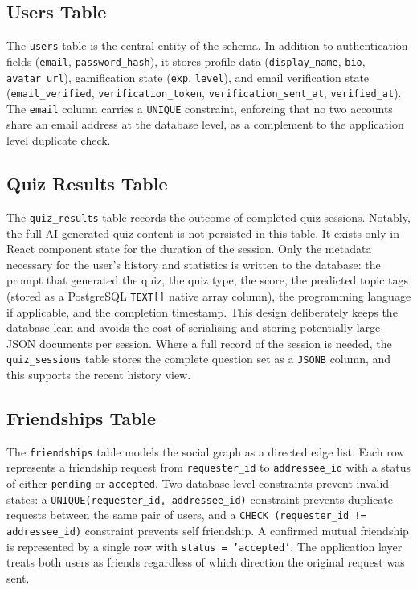\subsection{Users Table}

The \texttt{users} table is the central entity of the schema. In
addition to authentication fields (\texttt{email}, \texttt{password\_hash}),
it stores profile data (\texttt{display\_name}, \texttt{bio},
\texttt{avatar\_url}), gamification state (\texttt{exp}, \texttt{level}),
and email verification state (\texttt{email\_verified},
\texttt{verification\_token}, \texttt{verification\_sent\_at},
\texttt{verified\_at}). The \texttt{email} column carries a
\texttt{UNIQUE} constraint, enforcing that no two accounts share an
email address at the database level, as a complement to the application
level duplicate check.

\subsection{Quiz Results Table}

The \texttt{quiz\_results} table records the outcome of completed quiz
sessions. Notably, the full AI generated quiz content is not persisted
in this table. It exists only in React component state for the duration
of the session. Only the metadata necessary for the user's history and
statistics is written to the database: the prompt that generated the
quiz, the quiz type, the score, the predicted topic tags (stored as a
PostgreSQL \texttt{TEXT[]} native array column), the programming
language if applicable, and the completion timestamp. This design
deliberately keeps the database lean and avoids the cost of serialising
and storing potentially large JSON documents per session. Where a full
record of the session is needed, the \texttt{quiz\_sessions} table
stores the complete question set as a \texttt{JSONB} column, and this
supports the recent history view.

\subsection{Friendships Table}

The \texttt{friendships} table models the social graph as a directed
edge list. Each row represents a friendship request from
\texttt{requester\_id} to \texttt{addressee\_id} with a status of
either \texttt{pending} or \texttt{accepted}. Two database level
constraints prevent invalid states: a \texttt{UNIQUE(requester\_id,
addressee\_id)} constraint prevents duplicate requests between the same
pair of users, and a \texttt{CHECK (requester\_id != addressee\_id)}
constraint prevents self friendship. A confirmed mutual friendship is
represented by a single row with \texttt{status = 'accepted'}. The
application layer treats both users as friends regardless of which
direction the original request was sent.

